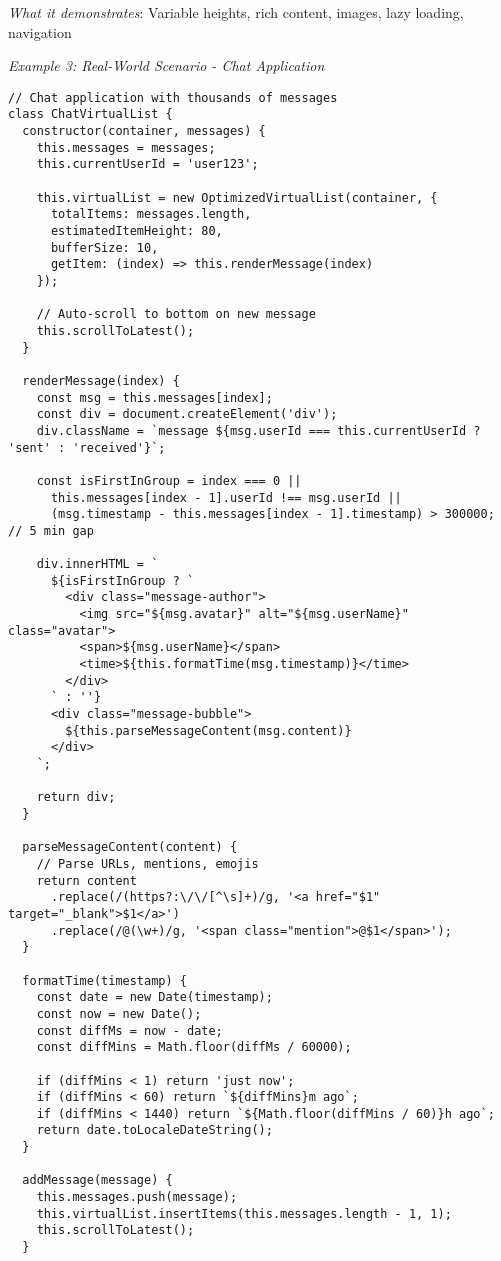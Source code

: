 \documentclass[11pt]{article}
\begin{document}
\emph{What it demonstrates}: Variable heights, rich content, images, lazy loading, navigation

\emph{Example 3: Real-World Scenario - Chat Application}

\begin{verbatim}
// Chat application with thousands of messages
class ChatVirtualList {
  constructor(container, messages) {
    this.messages = messages;
    this.currentUserId = 'user123';
    
    this.virtualList = new OptimizedVirtualList(container, {
      totalItems: messages.length,
      estimatedItemHeight: 80,
      bufferSize: 10,
      getItem: (index) => this.renderMessage(index)
    });
    
    // Auto-scroll to bottom on new message
    this.scrollToLatest();
  }
  
  renderMessage(index) {
    const msg = this.messages[index];
    const div = document.createElement('div');
    div.className = `message ${msg.userId === this.currentUserId ? 'sent' : 'received'}`;
    
    const isFirstInGroup = index === 0 || 
      this.messages[index - 1].userId !== msg.userId ||
      (msg.timestamp - this.messages[index - 1].timestamp) > 300000; // 5 min gap
    
    div.innerHTML = `
      ${isFirstInGroup ? `
        <div class="message-author">
          <img src="${msg.avatar}" alt="${msg.userName}" class="avatar">
          <span>${msg.userName}</span>
          <time>${this.formatTime(msg.timestamp)}</time>
        </div>
      ` : ''}
      <div class="message-bubble">
        ${this.parseMessageContent(msg.content)}
      </div>
    `;
    
    return div;
  }
  
  parseMessageContent(content) {
    // Parse URLs, mentions, emojis
    return content
      .replace(/(https?:\/\/[^\s]+)/g, '<a href="$1" target="_blank">$1</a>')
      .replace(/@(\w+)/g, '<span class="mention">@$1</span>');
  }
  
  formatTime(timestamp) {
    const date = new Date(timestamp);
    const now = new Date();
    const diffMs = now - date;
    const diffMins = Math.floor(diffMs / 60000);
    
    if (diffMins < 1) return 'just now';
    if (diffMins < 60) return `${diffMins}m ago`;
    if (diffMins < 1440) return `${Math.floor(diffMins / 60)}h ago`;
    return date.toLocaleDateString();
  }
  
  addMessage(message) {
    this.messages.push(message);
    this.virtualList.insertItems(this.messages.length - 1, 1);
    this.scrollToLatest();
  }
  

\end{verbatim}
\end{document}
